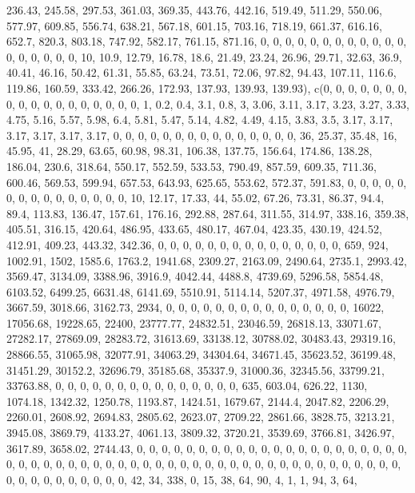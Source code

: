 \documentclass[
]{article}
\begin{document}
236.43, 245.58, 297.53, 361.03, 369.35, 443.76, 442.16, 519.49, 511.29,
550.06, 577.97, 609.85, 556.74, 638.21, 567.18, 601.15, 703.16, 718.19,
661.37, 616.16, 652.7, 820.3, 803.18, 747.92, 582.17, 761.15, 871.16, 0,
0, 0, 0, 0, 0, 0, 0, 0, 0, 0, 0, 0, 0, 0, 0, 0, 0, 10, 10.9, 12.79,
16.78, 18.6, 21.49, 23.24, 26.96, 29.71, 32.63, 36.9, 40.41, 46.16,
50.42, 61.31, 55.85, 63.24, 73.51, 72.06, 97.82, 94.43, 107.11, 116.6,
119.86, 160.59, 333.42, 266.26, 172.93, 137.93, 139.93, 139.93), c(0, 0,
0, 0, 0, 0, 0, 0, 0, 0, 0, 0, 0, 0, 0, 0, 0, 0, 1, 0.2, 0.4, 3.1, 0.8,
3, 3.06, 3.11, 3.17, 3.23, 3.27, 3.33, 4.75, 5.16, 5.57, 5.98, 6.4,
5.81, 5.47, 5.14, 4.82, 4.49, 4.15, 3.83, 3.5, 3.17, 3.17, 3.17, 3.17,
3.17, 3.17, 0, 0, 0, 0, 0, 0, 0, 0, 0, 0, 0, 0, 0, 0, 0, 36, 25.37,
35.48, 16, 45.95, 41, 28.29, 63.65, 60.98, 98.31, 106.38, 137.75,
156.64, 174.86, 138.28, 186.04, 230.6, 318.64, 550.17, 552.59, 533.53,
790.49, 857.59, 609.35, 711.36, 600.46, 569.53, 599.94, 657.53, 643.93,
625.65, 553.62, 572.37, 591.83, 0, 0, 0, 0, 0, 0, 0, 0, 0, 0, 0, 0, 0,
0, 0, 10, 12.17, 17.33, 44, 55.02, 67.26, 73.31, 86.37, 94.4, 89.4,
113.83, 136.47, 157.61, 176.16, 292.88, 287.64, 311.55, 314.97, 338.16,
359.38, 405.51, 316.15, 420.64, 486.95, 433.65, 480.17, 467.04, 423.35,
430.19, 424.52, 412.91, 409.23, 443.32, 342.36, 0, 0, 0, 0, 0, 0, 0, 0,
0, 0, 0, 0, 0, 0, 0, 659, 924, 1002.91, 1502, 1585.6, 1763.2, 1941.68,
2309.27, 2163.09, 2490.64, 2735.1, 2993.42, 3569.47, 3134.09, 3388.96,
3916.9, 4042.44, 4488.8, 4739.69, 5296.58, 5854.48, 6103.52, 6499.25,
6631.48, 6141.69, 5510.91, 5114.14, 5207.37, 4971.58, 4976.79, 3667.59,
3018.66, 3162.73, 2934, 0, 0, 0, 0, 0, 0, 0, 0, 0, 0, 0, 0, 0, 0, 0,
16022, 17056.68, 19228.65, 22400, 23777.77, 24832.51, 23046.59,
26818.13, 33071.67, 27282.17, 27869.09, 28283.72, 31613.69, 33138.12,
30788.02, 30483.43, 29319.16, 28866.55, 31065.98, 32077.91, 34063.29,
34304.64, 34671.45, 35623.52, 36199.48, 31451.29, 30152.2, 32696.79,
35185.68, 35337.9, 31000.36, 32345.56, 33799.21, 33763.88, 0, 0, 0, 0,
0, 0, 0, 0, 0, 0, 0, 0, 0, 0, 0, 635, 603.04, 626.22, 1130, 1074.18,
1342.32, 1250.78, 1193.87, 1424.51, 1679.67, 2144.4, 2047.82, 2206.29,
2260.01, 2608.92, 2694.83, 2805.62, 2623.07, 2709.22, 2861.66, 3828.75,
3213.21, 3945.08, 3869.79, 4133.27, 4061.13, 3809.32, 3720.21, 3539.69,
3766.81, 3426.97, 3617.89, 3658.02, 2744.43, 0, 0, 0, 0, 0, 0, 0, 0, 0,
0, 0, 0, 0, 0, 0, 0, 0, 0, 0, 0, 0, 0, 0, 0, 0, 0, 0, 0, 0, 0, 0, 0, 0,
0, 0, 0, 0, 0, 0, 0, 0, 0, 0, 0, 0, 0, 0, 0, 0, 0, 0, 0, 0, 0, 0, 0, 0,
0, 0, 0, 0, 0, 0, 0, 42, 34, 338, 0, 15, 38, 64, 90, 4, 1, 1, 94, 3, 64,
\end{document}

